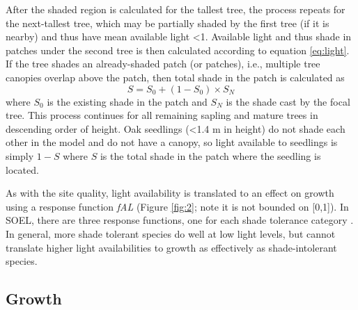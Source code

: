 \documentclass[
11pt, %
a4paper, %
oneside, %
headinclude,footinclude, %
]{scrartcl}
\begin{document}
After the shaded region is calculated for the tallest tree, the process repeats for the next-tallest tree, which may be partially shaded by the first tree (if it is nearby) and thus have mean available light \textless 1. Available light and thus shade in patches under the second tree is then calculated according to equation \ref{eq:light}. If the tree shades an already-shaded patch (or patches), i.e., multiple tree canopies overlap above the patch, then total shade in the patch is calculated as
\begin{equation}
S = S_0 + (1 - S_0) \times S_N
\end{equation}
where $S_0$ is the existing shade in the patch and $S_N$ is the shade cast by the focal tree. This process continues for all remaining sapling and mature trees in descending order of height. Oak seedlings (\textless 1.4 m in height) do not shade each other in the model and do not have a canopy, so light available to seedlings is simply $1 - S$ where $S$ is the total shade in the patch where the seedling is located.

As with the site quality, light availability is translated to an effect on growth using a response function \textit{fAL} (Figure \ref{fig:2}; note it is not bounded on [0,1]). In SOEL, there are three response functions, one for each shade tolerance category \citep{Bonan1992}. In general, more shade tolerant species do well at low light levels, but cannot translate higher light availabilities to growth as effectively as shade-intolerant species.

\subsection{Growth}
\end{document}
